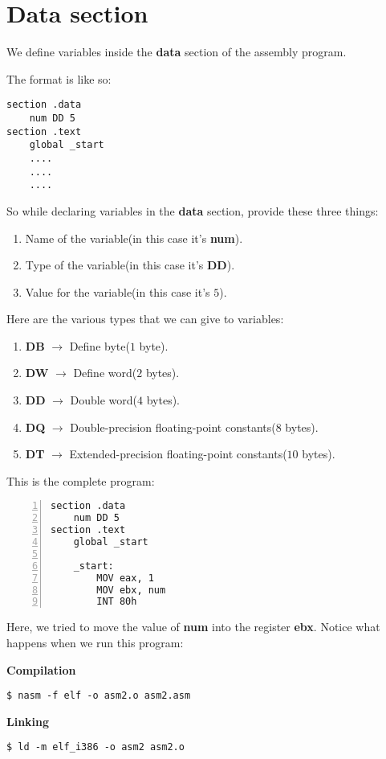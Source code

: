 \documentclass{article}
\makeatletter
\renewcommand\paragraph{\@startsection{paragraph}{4}{\z@}{-3.25ex \@plus -1ex \@minus -.2ex}{1.5ex \@plus .2ex}{\normalfont\normalsize\bfseries}}
\makeatother
\begin{document}
\section{Data section}\label{sec:dSection}
\paragraph{}
We define variables inside the \textbf{data} section of the assembly program.

The format is like so:
\begin{Verbatim}[frame=single]
section .data
	num DD 5
section .text
	global _start
	....
	....
	....
\end{Verbatim}
So while declaring variables in the \textbf{data} section, provide these three things:
\begin{enumerate}
\item Name of the variable(in this case it's \textbf{num}).
\item Type of the variable(in this case it's \textbf{DD}).
\item Value for the variable(in this case it's $5$).
\end{enumerate}

Here are the various types that we can give to variables:
\begin{enumerate}
\item \textbf{DB} $\rightarrow$ Define byte($1$ byte).
\item \textbf{DW} $\rightarrow$ Define word($2$ bytes).
\item \textbf{DD} $\rightarrow$ Double word($4$ bytes).
\item \textbf{DQ} $\rightarrow$ Double-precision floating-point constants($8$ bytes).
\item \textbf{DT} $\rightarrow$ Extended-precision floating-point constants($10$ bytes).
\end{enumerate}

This is the complete program:

\begin{Verbatim}[numbers=left, frame=single]
section .data
	num DD 5
section .text
	global _start
	
	_start:
		MOV eax, 1
		MOV ebx, num
		INT 80h
\end{Verbatim}

Here, we tried to move the value of \textbf{num} into the register \textbf{ebx}.
\newpage
Notice what happens when we run this program:

\textbf{Compilation}
\begin{Verbatim}[frame=single]
$ nasm -f elf -o asm2.o asm2.asm
\end{Verbatim}
\textbf{Linking}
\begin{Verbatim}[frame=single]
$ ld -m elf_i386 -o asm2 asm2.o
\end{Verbatim}
\end{document}
